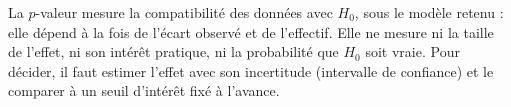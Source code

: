 {\begin{enumerate}
{La $p$-valeur mesure la compatibilité des données avec $H_0$, sous le modèle retenu : elle dépend à la fois de l'écart observé et de l'effectif. Elle ne mesure ni la taille de l'effet, ni son intérêt pratique, ni la probabilité que $H_0$ soit vraie. Pour décider, il faut estimer l'effet avec son incertitude (intervalle de confiance) et le comparer à un seuil d'intérêt fixé à l'avance.}
\end{enumerate}
}
